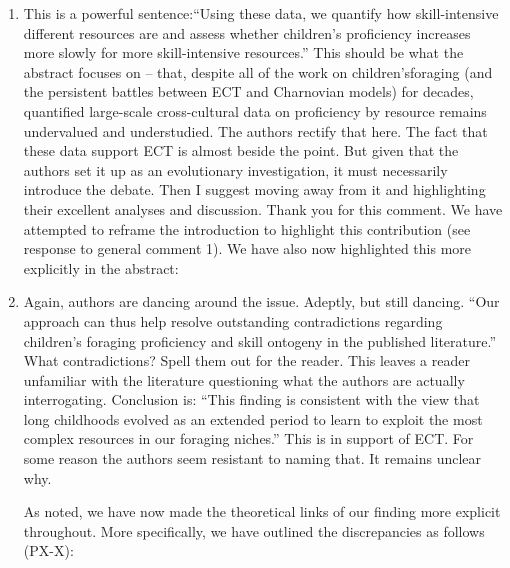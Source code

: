 \documentclass{article}
\newcommand{\rev}[1]{{\color{ForestGreen}#1}}
\begin{document}
\begin{enumerate}
    \item This is a powerful sentence:“Using these data, we quantify how skill-intensive different resources are and assess whether children’s proficiency increases more slowly for more skill-intensive resources.” This should be what the abstract focuses on – that, despite all of the work on children’sforaging (and the persistent battles between ECT and Charnovian models) for decades, quantified large-scale cross-cultural data on proficiency by resource remains undervalued and understudied. The authors rectify that here. The fact that these data support ECT is almost beside the point. But given that the authors set it up as an evolutionary investigation, it must necessarily introduce the debate. Then I suggest moving away from it and highlighting their excellent analyses and discussion.
\rev{Thank you for this comment. We have attempted to reframe the introduction to highlight this contribution (see response to general comment 1). We have also now highlighted this more explicitly in the abstract:
}

    \item Again, authors are dancing around the issue. Adeptly, but still dancing. “Our approach can thus help resolve outstanding contradictions regarding children’s foraging proficiency and skill ontogeny in the published literature.” What contradictions? Spell them out for the reader. This leaves a reader unfamiliar with the literature questioning what the authors are actually interrogating. Conclusion is: “This finding is consistent with the view that long childhoods evolved as an extended period to learn to exploit the most complex resources in our foraging niches.” This is in support of ECT. For some reason the authors seem resistant to naming that. It remains unclear why.


\rev{As noted, we have now made the theoretical links of our finding more explicit throughout. More specifically, we have outlined the discrepancies as follows (PX-X):
}


\end{enumerate}
\end{document}
